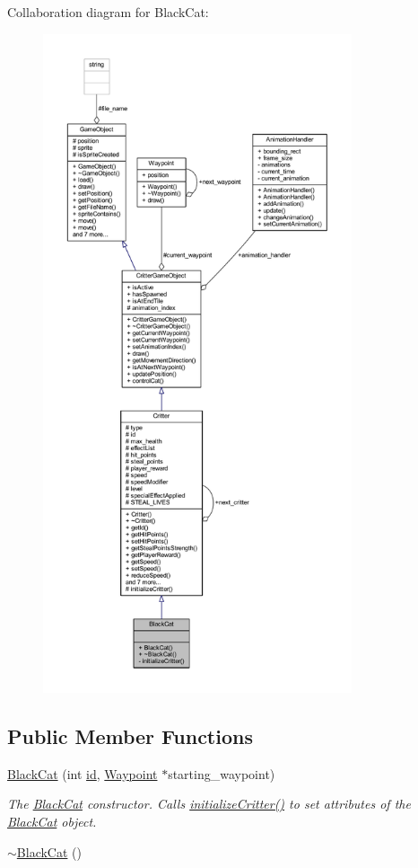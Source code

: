 Collaboration diagram for Black\+Cat\+:\nopagebreak
\begin{figure}[H]
\begin{center}
\leavevmode
\includegraphics[height=550pt]{class_black_cat__coll__graph}
\end{center}
\end{figure}
\subsection*{Public Member Functions}
\begin{DoxyCompactItemize}
\item 
\hyperlink{class_black_cat_a7974aa98721932e53102c10484af1abe}{Black\+Cat} (int \hyperlink{class_critter_ae775e0ebe6e8bbe249c403670bda46f8}{id}, \hyperlink{class_waypoint}{Waypoint} $\ast$starting\+\_\+waypoint)
\begin{DoxyCompactList}\small\item\em The \hyperlink{class_black_cat}{Black\+Cat} constructor. Calls \hyperlink{class_black_cat_a2ae946e05f754f7d7bdbc753946425eb}{initialize\+Critter()} to set attributes of the \hyperlink{class_black_cat}{Black\+Cat} object. \end{DoxyCompactList}\item 
\hyperlink{class_black_cat_ae2d3786e829242eb070ce3adc41d7173}{$\sim$\+Black\+Cat} ()
\end{DoxyCompactItemize}
